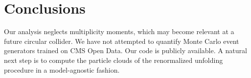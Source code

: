 \section{Conclusions}\label{sec:conclusions}

Our analysis neglects multiplicity moments, which may become relevant at
a future circular collider. We have not attempted to quantify Monte
Carlo event generators trained on CMS Open Data. Our code is publicly
available. A natural next step is to compute the particle clouds of the
renormalized unfolding procedure in a model-agnostic fashion.

